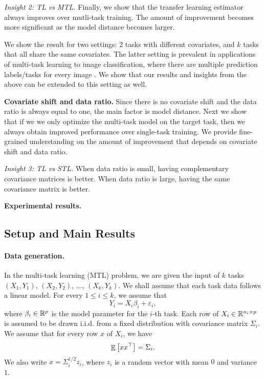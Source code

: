 	{\it Insight 2: TL vs MTL.} Finally, we show that the transfer learning estimator always improves over mutli-task training.
		The amount of improvement becomes more significant as the model distance becomes larger.

	We show the result for two settings: 2 tasks with different covariates, and $k$ tasks that all share the same covariates.
	The latter setting is prevalent in applications of multi-task learning to image classification, where there are multiple prediction labels/tasks for every image \cite{EA20}.
	We show that our results and insights from the above can be extended to this setting as well.



\smallskip
	\noindent\textbf{Covariate shift and data ratio.}
	Since there is no covariate shift and the data ratio is always equal to one, the main factor is model distance.
	Next we show that if we we only optimize the multi-task model on the target task, then we always obtain improved performance over single-task training.
	We provide fine-grained understanding on the amount of improvement that depends on covariate shift and data ratio.

	\textit{Insight 3: TL vs STL.} When data ratio is small, having complementary covariance matrices is better. When data ratio is large, having the same covariance matrix is better.

\smallskip
	\noindent\textbf{Experimental results.}

\subsection{Setup and Main Results}\label{sec_setup}

\paragraph{Data generation.}
In the multi-task learning (MTL) problem, we are given the input of $k$ tasks $(X_1, Y_1)$, $(X_2, Y_2)$, $\dots$, $(X_k, Y_k)$.
We shall assume that each task data follows a linear model.
For every $1\le i\le k$, we assume that
\[ Y_i = X_i \beta_i + \varepsilon_i, \]
where $\beta_i\in\mathbb{R}^p$ is the model parameter for the $i$-th task.
Each row of $X_i\in\mathbb{R}^{n_i\times p}$ is assumed to be drawn i.i.d. from a fixed distribution with covariance matrix $\Sigma_i$.
We assume that for every row $x$ of $X_i$, we have
\[ \mathop{\mathbb{E}}\left[ xx^{\top} \right] = \Sigma_i. \]
We also write $x = \Sigma_i^{1/2} z_i$, where $z_i$ is a random vector with mean $0$ and variance $1$.



